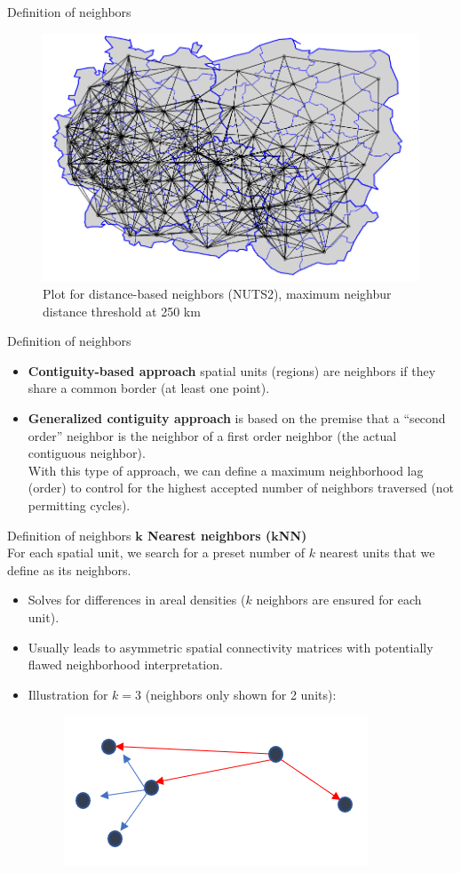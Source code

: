 \documentclass{beamer}
\begin{document}
\begin{frame}{Definition of neighbors}
\begin{figure}
	\includegraphics[width=.7\textwidth]{IMG/sp_neigb.PNG}
	\caption[]{Plot for distance-based neighbors (NUTS2), maximum neighbur distance threshold at 250 km}
\end{figure}
\end{frame}
\begin{frame}{Definition of neighbors}
\begin{itemize}
\item \textbf{Contiguity-based approach} spatial units (regions) are neighbors if they share a common border (at least one point).
\bigskip 
\item \textbf{Generalized contiguity approach} is based on the premise that a ``second order'' neighbor is the neighbor of a first order neighbor (the actual contiguous neighbor). \\ \smallskip With this type of approach, we can define a maximum neighborhood lag (order) to control for the highest accepted number
of neighbors traversed (not permitting cycles).	
\end{itemize}
\end{frame}
\begin{frame}{Definition of neighbors}
\textbf{$\bm{k}$ Nearest neighbors ($\bm{k}$NN)} \\
\medskip
For each spatial unit, we search for a preset number of $k$ nearest units that we define as its neighbors. 
\medskip
\begin{itemize}
	\item Solves for differences in areal densities ($k$ neighbors are ensured for each unit).
	\smallskip
	\item Usually leads to asymmetric spatial connectivity matrices with potentially flawed neighborhood interpretation. 
	\smallskip
	\item Illustration for $k = 3$   (neighbors only shown for 2 units):
	\begin{figure}
		\includegraphics[width=.2\textwidth]{IMG/sp_neigb2.PNG}
	\end{figure}
\end{itemize}
\end{frame}
\end{document}
